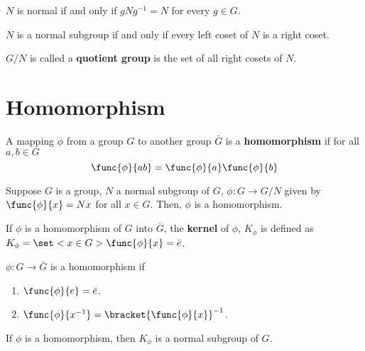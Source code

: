 \begin{lemma}
    \(N\) is normal if and only if \(gNg^{-1} = N\) for every \(g \in G\).
\end{lemma}

\begin{lemma}
    \(N\) is a normal subgroup if and only if every left coset of \(N\) is a right coset.
\end{lemma}

\begin{definition}
    \(G/N\) is called a \textbf{quotient group} is the set of all right cosets of \(N\).
\end{definition}

\section{Homomorphism}
\begin{definition}
    A mapping \(\phi\) from a group \(G\) to another group \(\bar{G}\) is a \textbf{homomorphism} if for all \(a,b \in G\)
    \begin{equation*}
        \func{\phi}{ab} = \func{\phi}{a} \func{\phi}{b}
    \end{equation*}
\end{definition}

\begin{lemma}
    Suppose \(G\) is a group, \(N\) a normal subgroup of \(G\), \(\phi: G \to G/N\) given by \(\func{\phi}{x} = Nx\) for all \(x \in G\). Then, \(\phi\) is a homomorphism.
\end{lemma}

\begin{definition}
    If \(\phi\) is a homomorphism of \(G\) into \(\bar{G}\), the \textbf{kernel} of \(\phi\), \(K_{\phi}\) is defined as \(K_{\phi} = \set<x \in G>{\func{\phi}{x} = \bar{e}}\).
\end{definition}

\begin{lemma}
    \(\phi: G \to \bar{G}\) is a homomorphism if 
    \begin{enumerate}
        \item \(\func{\phi}{e} = \bar{e}\).
        \item \(\func{\phi}{x^{-1}} = \bracket{\func{\phi}{x}}^{-1}\).
    \end{enumerate}
\end{lemma}

\begin{lemma}
    If \(\phi\) is a homomorphism, then \(K_{\phi}\) is a normal subgroup of \(G\).
\end{lemma}

